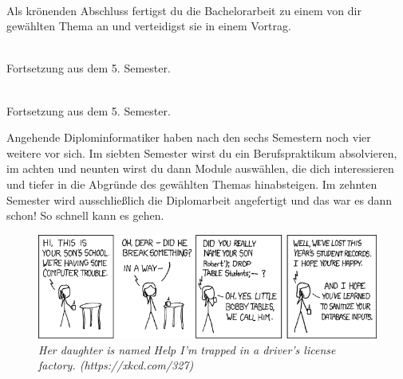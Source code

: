 \textbf{} \\
Als krönenden Abschluss fertigst du die Bachelorarbeit zu einem von dir gewählten Thema an und verteidigst sie in einem Vortrag.

\textbf{} \\
Fortsetzung aus dem 5. Semester.

\textbf{} \\
Fortsetzung aus dem 5. Semester.


Angehende Diplominformatiker haben nach den sechs Semestern noch vier weitere vor sich.
Im siebten Semester wirst du ein Berufspraktikum absolvieren, im achten und neunten wirst du dann Module auswählen, die dich interessieren und tiefer in die Abgründe des gewählten Themas hinabsteigen.
Im zehnten Semester wird ausschließlich die Diplomarbeit angefertigt und das war es dann schon!
So schnell kann es gehen.

\vfill

\begin{figure}[h!]
\centering
\includegraphics[scale=.5]{img/xkcd/exploits_of_a_mom.png}
\caption*{{\small \textit{Her daughter is named Help I'm trapped in a driver's license factory. (https://xkcd.com/327)}}}
\end{figure}
